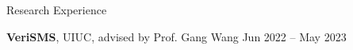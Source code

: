 \documentclass[hidelinks]{resume} %
\begin{document}
\begin{rSection}{R\MakeLowercase{esearch} E\MakeLowercase{xperience}}
\begin{itemize}
\end{itemize}

\vspace{-2pt}
\textbf{VeriSMS}, UIUC, advised by Prof. Gang Wang
\hfill Jun 2022 -- May 2023
\vspace{-5pt}
\begin{itemize}
\itemsep -7pt {} 








\end{itemize}
\end{rSection}
\end{document}
